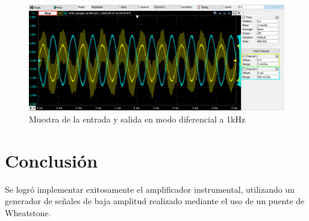 \documentclass[../../tc_tp3_main.tex]{subfiles}
\begin{document}
		\begin{figure}[h!]	
		\centering
		\includegraphics[scale=0.6]{imagenes/ganancia_diferencial_medido.png}
		\caption{Muestra de la entrada y salida en modo diferencial a 1kHz}
		\label{fig:ej3_ganancia_diferencial_medido}
	\end{figure}

\section{Conclusión}

Se logró implementar exitosamente el amplificador instrumental, utilizando un generador de señales de baja amplitud realizado mediante el uso de un puente de Wheatstone.
\end{document}
